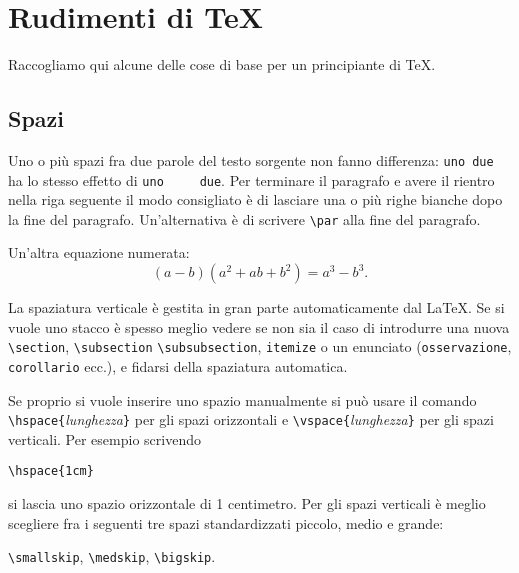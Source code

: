 


\chapter{Rudimenti di \TeX}

Raccogliamo qui alcune delle cose di base per un
principiante di \TeX.

\section{Spazi}

Uno o più spazi fra due parole del testo sorgente non
fanno differenza: \verb!uno due! ha lo stesso effetto
di \verb!uno     due!. Per terminare il
paragrafo e avere il rientro nella riga seguente il modo
consigliato è di lasciare una o più righe bianche dopo
la fine del paragrafo. Un'alternativa è di scrivere
\verb!\par! alla fine del paragrafo.

Un'altra equazione numerata:
\begin{equation}\label{prodottoNotevole2}
  (a-b)(a^2+ab+b^2)=a^3-b^3.
\end{equation}

La spaziatura verticale è gestita in gran parte
automaticamente dal \LaTeX. Se si vuole uno stacco è
spesso meglio vedere se non sia il caso di introdurre una
nuova \verb!\section!, \verb!\subsection!
\verb!\subsubsection!, \verb!itemize! o un enunciato
(\verb!osservazione!, \verb!corollario! ecc.), e fidarsi
della spaziatura automatica.

Se proprio si vuole inserire uno spazio manualmente si
può usare il comando
\verb!\hspace{!\textit{lunghezza}\verb!}! per gli spazi
orizzontali e \verb!\vspace{!\textit{lunghezza}\verb!}!
per gli spazi verticali. Per esempio scrivendo
\begin{center}
  \verb!\hspace{1cm}!
\end{center}
si lascia uno spazio orizzontale di 1 centimetro.
Per gli spazi verticali è meglio scegliere fra i
seguenti tre spazi standardizzati piccolo, medio e grande:
\begin{center}
  \verb!\smallskip!, \verb!\medskip!, \verb!\bigskip!.
\end{center}

